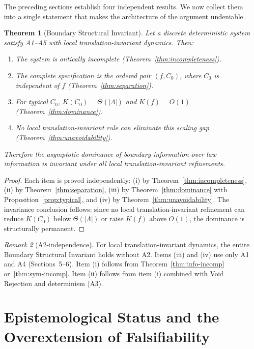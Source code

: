 \documentclass[12pt]{article}
\theoremstyle{plain}
\newtheorem{theorem}{Theorem}[section]
\theoremstyle{definition}
\theoremstyle{remark}
\newtheorem{remark}[theorem]{Remark}
\newcommand{\Lattice}{\Lambda}
\begin{document}
The preceding sections establish four independent results. We now collect them into a single statement that makes the architecture of the argument undeniable.

\begin{theorem}[Boundary Structural Invariant]\label{thm:structural-invariant}
Let a discrete deterministic system satisfy A1--A5 with local translation-invariant dynamics. Then:
\begin{enumerate}[label=(\roman*)]
  \item The system is ontically incomplete (Theorem~\ref{thm:incompleteness}).
  \item The complete specification is the ordered pair $(f, C_0)$, where $C_0$ is independent of $f$ (Theorem~\ref{thm:separation}).
  \item For typical $C_0$, $K(C_0) = \Theta(|\Lattice|)$ and $K(f) = O(1)$ (Theorem~\ref{thm:dominance}).
  \item No local translation-invariant rule can eliminate this scaling gap (Theorem~\ref{thm:unavoidability}).
\end{enumerate}
Therefore the asymptotic dominance of boundary information over law information is invariant under all local translation-invariant refinements.
\end{theorem}

\begin{proof}
Each item is proved independently: (i) by Theorem~\ref{thm:incompleteness}, (ii) by Theorem~\ref{thm:separation}, (iii) by Theorem~\ref{thm:dominance} with Proposition~\ref{prop:typical}, and (iv) by Theorem~\ref{thm:unavoidability}. The invariance conclusion follows: since no local translation-invariant refinement can reduce $K(C_0)$ below $\Theta(|\Lattice|)$ or raise $K(f)$ above $O(1)$, the dominance is structurally permanent.
\end{proof}

\begin{remark}[A2-independence]\label{rem:a2-free}
For local translation-invariant dynamics, the entire Boundary Structural Invariant holds without A2. Items (iii) and (iv) use only A1 and A4 (Sections~5--6). Item (i) follows from Theorem~\ref{thm:info-incomp} or~\ref{thm:sym-incomp}. Item (ii) follows from item (i) combined with Void Rejection and determinism (A3).
\end{remark}


\section{Epistemological Status and the Overextension of Falsifiability}
\end{document}
